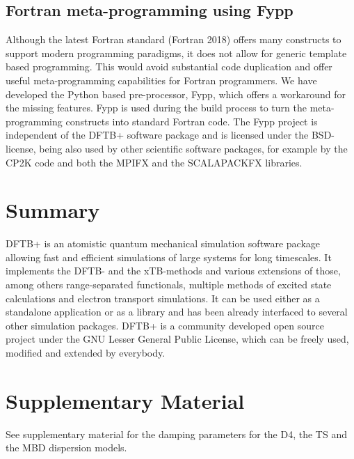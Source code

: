 \documentclass{revtex4-1}
\newcommand{\dftbp}{DFTB+}
\begin{document}
\subsection{Fortran meta-programming using Fypp}
Although the latest Fortran standard (Fortran 2018) offers many constructs to
support modern programming paradigms, it does not allow for generic template
based programming. This would avoid substantial code duplication and offer
useful meta-programming capabilities for Fortran programmers. We have developed
the Python based pre-processor, Fypp,\cite{fypp-repo} which offers a workaround
for the missing features. Fypp is used during the build process to
turn the meta-programming constructs into standard Fortran code. The
Fypp project is independent of the \dftbp{} software package and is licensed
under the BSD-license, being also used by other scientific software packages,
for example by the CP2K code\cite{cp2k-repo} and both the MPIFX and the
SCALAPACKFX libraries.


\section{Summary}

\dftbp{} is an atomistic quantum mechanical simulation software package allowing
fast and efficient simulations of large systems for long timescales. It
implements the DFTB- and the xTB-methods and various extensions of those, among
others range-separated functionals, multiple methods of excited state
calculations and electron transport simulations. It can be used either as a
standalone application or as a library and has been already interfaced to
several other simulation packages. \dftbp{} is a community developed open source
project under the GNU Lesser General Public License, which can be freely used,
modified and extended by everybody.


\section*{Supplementary Material}

See supplementary material for the damping parameters for the D4, the TS and the
MBD dispersion models.
\end{document}
